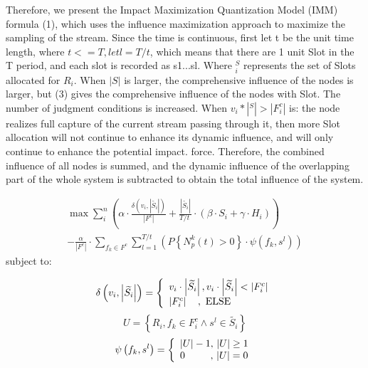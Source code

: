 \documentclass[conference,compsoc]{IEEEtran}
\begin{document}
Therefore, we present the Impact Maximization Quantization Model (IMM) formula (1), which uses the influence maximization approach to maximize the sampling of the stream. Since the time is continuous, first let t be the unit time length, where $t<=T, let l = T/t$, which means that there are 1 unit Slot in the T period, and each slot is recorded as s1...sl. Where $^S_i$ represents the set of Slots allocated for $R_i$. When $|S|$ is larger, the comprehensive influence of the nodes is larger, but (3) gives the comprehensive influence of the nodes with Slot. The number of judgment conditions is increased. When $v_i*|^S| >|F^c_i|$ is: the node realizes full capture of the current stream passing through it, then more Slot allocation will not continue to enhance its dynamic influence, and will only continue to enhance the potential impact. force. Therefore, the combined influence of all nodes is summed, and the dynamic influence of the overlapping part of the whole system is subtracted to obtain the total influence of the system.




\begin{equation}
\begin{split}
\max \sum\limits_{i}^{n}{(\alpha \cdot \frac{\delta ({{v}_{i}},\left| \widetilde{{{S}_{i}}} \right|)}{\left| {{F}^{c}} \right|}+\frac{\left| \widetilde{{{S}_{i}}} \right|}{{T}/{t}\;}\cdot (\beta \cdot {{S}_{i}}+\gamma \cdot {{H}_{i}}))}  \\
-\frac{\alpha }{\left| {{F}^{c}} \right|}\cdot \sum\limits_{{{f}_{k}}\in {{F}^{c}}}{\sum\limits_{l=1}^{{T}/{t}\;}{\left( P\left\{ N_{p}^{k}\left( t \right)>0 \right\}\cdot \psi \left( {{f}_{k}},{{s}^{l}} \right) \right)}}
\end{split}
\end{equation}
subject to:
 
\begin{equation}
\delta \left( {{v_i},\left| {\widetilde {{S_i}}} \right|} \right) = \left\{ \begin{array}{l}
{v_i} \cdot \left| {\widetilde {{S_i}}} \right|,{\rm{    }}{v_i} \cdot \left| {\widetilde {{S_i}}} \right| < \left| {F_i^c} \right|\\
\left| {F_i^c} \right|{\rm{   }}\quad,\ {\rm{    ELSE}}
\end{array} \right.
\end{equation}
\begin{equation}
U = \left\{ {{R_i},{f_k} \in F_i^c \wedge {s^l} \in \widetilde {{S_i}}} \right\}
\end{equation}
\begin{equation}
\psi \left( {{f_k},{s^l}} \right) = \left\{ \begin{array}{l}
\left| U \right| - 1,{\rm{    }}\left| U \right| \ge 1\\
{\rm{   }}0\quad \quad \; \; ,\, \left| U \right| = 0
\end{array} \right.
\end{equation}
 
\end{document}
